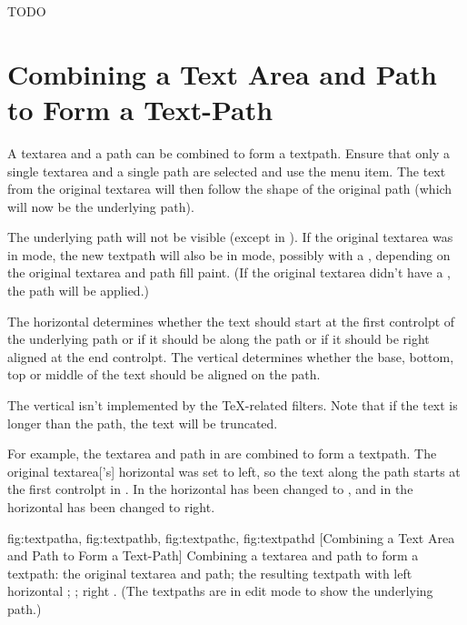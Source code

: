 TODO


\section{Combining a Text Area and Path to Form a Text-Path}\label{sec:textpath}


A \gls{textarea} and a \gls{path} can be combined to form a
\gls{textpath}. Ensure that only a single \gls{textarea} and a
single \gls{path} are selected and use the 
menu item. The text from the original \gls{textarea} will then follow
the shape of the original path (which will now be the underlying
path).

The underlying path will not be visible (except in \editpathmode).
If the original \gls*{textarea} was in  mode, the new
\gls*{textpath} will also be in  mode, possibly with a 
, depending on the original \gls*{textarea} and \gls*{path}
fill paint. (If the original \gls*{textarea} didn't have a
, the \gls*{path}  will be applied.)

The horizontal  determines
whether the text should start at the first \gls{controlpt} of the
underlying path or if it should be  along the path or if
it should be right aligned at the end \gls*{controlpt}. The vertical
 determines whether the base, bottom, top or middle of the
text should be aligned on the path. 

\begin{important}
The vertical  isn't implemented by the
 \TeX-related filters. Note that if the text is
longer than the path, the text will be truncated.
\end{important}

For example, the \gls{textarea} and \gls{path} in
 are combined to form a \gls*{textpath}.
The original \gls*{textarea}['s] horizontal  was
set to left, so the text along the path starts at the first
\gls{controlpt} in . In
 the horizontal  has been
changed to , and in  the
horizontal  has been changed to right.

{
 {fig:textpatha}{}{},
 {fig:textpathb}{}{},
 {fig:textpathc}{}{},
 {fig:textpathd}{}{}
}
[Combining a Text Area and Path to Form a Text-Path]
{Combining a \gls{textarea} and \gls{path} to form a \gls{textpath}:
 the original \gls{textarea} and \gls{path};
 the resulting \gls{textpath} with left horizontal 
; 
  ; 
 right . 
(The \glspl{textpath} are in edit mode to show the underlying path.)}

